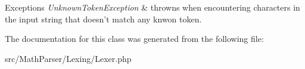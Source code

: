 \begin{DoxyExceptions}{Exceptions}
{\em Unknown\-Token\-Exception} & throwns when encountering characters in the input string that doesn't match any knwon token. \\
\hline
\end{DoxyExceptions}


The documentation for this class was generated from the following file\-:\begin{DoxyCompactItemize}
\item 
src/\-Math\-Parser/\-Lexing/Lexer.\-php\end{DoxyCompactItemize}
